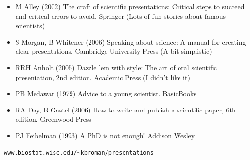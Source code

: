 \documentclass[12pt]{article}
\newcommand{\smallestsize}{\fontsize{18}{22} \selectfont}
\begin{document}
\hfill \begin{minipage}{10in}

\begin{itemize}
\setlength{\rightskip}{0pt plus 1fil} %
\itemsep24pt
\item M Alley (2002) The craft of scientific presentations: Critical
  steps to succeed and critical errors to avoid.  Springer
{\color{myblue} \smallestsize (Lots of fun stories about famous scientists)}


\item S Morgan, B Whitener (2006) Speaking about science: A manual for
  creating clear presentations.  Cambridge University Press 
{\color{myblue} \smallestsize (A bit simplistic)}

\item RRH Anholt (2005) Dazzle 'em with style: The art of oral
  scientific presentation, 2nd edition.  Academic Press 
{\color{myblue} \smallestsize (I didn't like it)}

\item PB Medawar (1979) Advice to a young scientist.  BasicBooks

\item RA Day, B Gastel (2006) How to write and publish a scientific
  paper, 6th edition.  Greenwood Press


\item PJ Feibelman (1993) A PhD is not enough!  Addison Wesley

\end{itemize}
\end{minipage}

\vfill

\hfill
{\color{myblue} \smallestsize
\verb|www.biostat.wisc.edu/~kbroman/presentations|}

\vspace{15mm}
\end{document}
